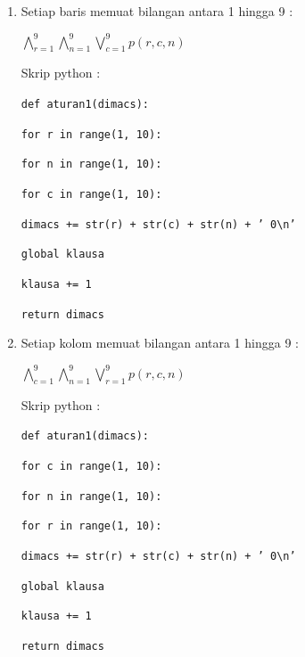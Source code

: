 \begin{enumerate}
	\item Setiap baris memuat bilangan antara 1 
	hingga 9 : 
	
	$\bigwedge_{r=1}^{9}$$\bigwedge_{n=1}^{9}$$\bigvee_{c=1}^{9}$$p\left(r,c,n\right)$
	
	\vspace{5mm}
	
	Skrip python :
	
	\vspace{5mm}
	
	\texttt{def aturan1(dimacs):}
	
	\qquad\qquad\texttt{for r in range(1, 10):}
	
	\qquad\qquad\qquad\texttt{for n in range(1, 10):}
	
	\qquad\qquad\qquad\qquad\texttt{for c in range(1, 10):}
	
	\qquad\qquad\qquad\qquad\qquad\texttt{dimacs += str(r) + str(c) + str(n) + ' 0\textbackslash n'}
	
	\qquad\qquad\qquad\qquad\texttt{global klausa}
	
	\qquad\qquad\qquad\qquad\texttt{klausa += 1}
	
	\qquad\qquad\texttt{return dimacs}
	
	
	\item Setiap kolom memuat bilangan antara 1 hingga 9 : 
	
	$\bigwedge_{c=1}^{9}$$\bigwedge_{n=1}^{9}$$\bigvee_{r=1}^{9}$$p\left(r,c,n\right)$
	
	
	\vspace{5mm}
	
	Skrip python :
	
	\vspace{5mm}
	
	\texttt{def aturan1(dimacs):}
	
	\qquad \qquad\texttt{for c in range(1, 10):}
	
	\qquad \qquad \qquad\texttt{for n in range(1, 10):}
	
	\qquad \qquad \qquad \qquad\texttt{for r in range(1, 10):}
	
	\qquad\qquad\qquad\qquad\qquad\texttt{dimacs += str(r) + str(c) + str(n) + ' 0\textbackslash n'}
	
	\qquad \qquad \qquad \qquad\texttt{global klausa}
	
	\qquad \qquad \qquad \qquad\texttt{klausa += 1}
	
	\qquad \qquad\texttt{return dimacs}
	

\end{enumerate}
